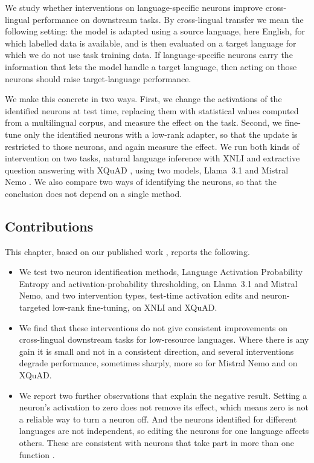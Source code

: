 We study whether interventions on language-specific neurons improve cross-lingual
performance on downstream tasks. By cross-lingual transfer we mean the following
setting: the model is adapted using a source language, here English, for which
labelled data is available, and is then evaluated on a target language for which
we do not use task training data. If language-specific neurons carry the
information that lets the model handle a target language, then acting on those
neurons should raise target-language performance.

We make this concrete in two ways. First, we change the activations of the
identified neurons at test time, replacing them with statistical values computed
from a multilingual corpus, and measure the effect on the task. Second, we
fine-tune only the identified neurons with a low-rank adapter, so that the update
is restricted to those neurons, and again measure the effect. We run both kinds of
intervention on two tasks, natural language inference with XNLI
\citep{conneau2018xnli} and extractive question answering with XQuAD
\citep{artetxe2020cross}, using two models, Llama~3.1 \citep{grattafiori2024llama}
and Mistral Nemo \citep{mistral2024nemo}. We also compare two ways of identifying
the neurons, so that the conclusion does not depend on a single method.

\subsection{Contributions}
\label{subsec:neurons-contributions}

This chapter, based on our published work \citep{mondal2025language}, reports the
following.

\begin{itemize}
	\item We test two neuron identification methods, Language Activation
	Probability Entropy and activation-probability thresholding, on Llama~3.1 and
	Mistral Nemo, and two intervention types, test-time activation edits and
	neuron-targeted low-rank fine-tuning, on XNLI and XQuAD.
	
	\item We find that these interventions do not give consistent improvements on
	cross-lingual downstream tasks for low-resource languages. Where there is any
	gain it is small and not in a consistent direction, and several interventions
	degrade performance, sometimes sharply, more so for Mistral Nemo and on XQuAD.
	
	\item We report two further observations that explain the negative result.
	Setting a neuron's activation to zero does not remove its effect, which means
	zero is not a reliable way to turn a neuron off. And the neurons identified for
	different languages are not independent, so editing the neurons for one
	language affects others. These are consistent with neurons that take part in
	more than one function \citep{elhage2022superposition}.
\end{itemize}

